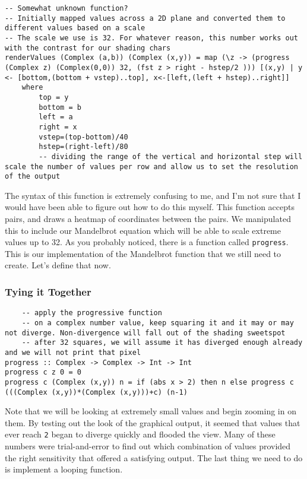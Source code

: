 \documentclass{article}
\begin{document}
    \begin{lstlisting}
-- Somewhat unknown function?
-- Initially mapped values across a 2D plane and converted them to different values based on a scale
-- The scale we use is 32. For whatever reason, this number works out with the contrast for our shading chars
renderValues (Complex (a,b)) (Complex (x,y)) = map (\z -> (progress (Complex z) (Complex(0,0)) 32, (fst z > right - hstep/2 ))) [(x,y) | y <- [bottom,(bottom + vstep)..top], x<-[left,(left + hstep)..right]]
    where
        top = y
        bottom = b
        left = a
        right = x
        vstep=(top-bottom)/40 
        hstep=(right-left)/80
        -- dividing the range of the vertical and horizontal step will scale the number of values per row and allow us to set the resolution of the output
    \end{lstlisting}
    
    \medskip\noindent
    The syntax of this function is extremely confusing to me, and I'm not sure that I would have been able to figure out how to do this myself. This function accepts pairs, and draws a heatmap of coordinates between the pairs. We manipulated this to include our Mandelbrot equation which will be able to scale extreme values up to 32. As you probably noticed, there is a function called \lstinline{progress}. This is our implementation of the Mandelbrot function that we still need to create. Let's define that now.
    
    \subsubsection{Tying it Together}
    
    \begin{lstlisting}
    -- apply the progressive function 
    -- on a complex number value, keep squaring it and it may or may not diverge. Non-divergence will fall out of the shading sweetspot
    -- after 32 squares, we will assume it has diverged enough already and we will not print that pixel
progress :: Complex -> Complex -> Int -> Int
progress c z 0 = 0
progress c (Complex (x,y)) n = if (abs x > 2) then n else progress c (((Complex (x,y))*(Complex (x,y)))+c) (n-1) 
    \end{lstlisting}
    
    \medskip\noindent
    Note that we will be looking at extremely small values and begin zooming in on them. By testing out the look of the graphical output, it seemed that values that ever reach \lstinline{2} began to diverge quickly and flooded the view. Many of these numbers were trial-and-error to find out which combination of values provided the right sensitivity that offered a satisfying output. The last thing we need to do is implement a looping function.
    
\end{document}
